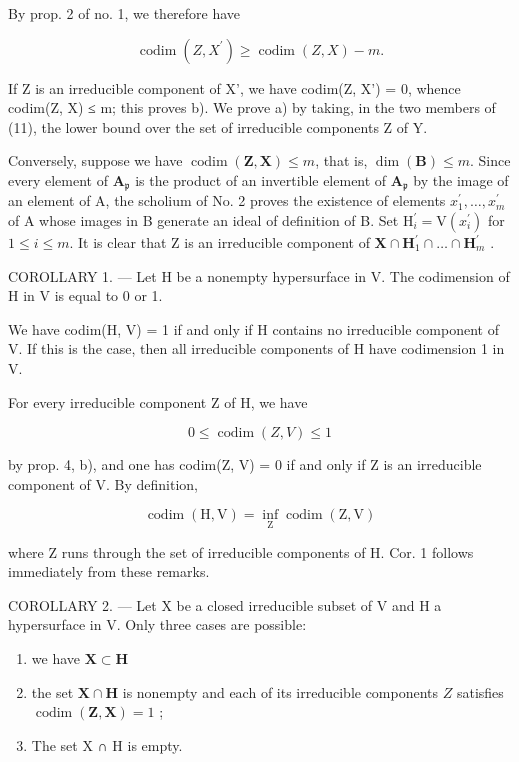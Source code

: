 By prop. 2 of no. 1, we therefore have

\[
\operatorname{codim} (Z, X ^ {\prime}) \geqslant \operatorname{codim} (Z, X) - m.\tag{11}
\]

If Z is an irreducible component of X', we have codim(Z, X') = 0, whence codim(Z, X) ≤ m; this proves b). We prove a) by taking, in the two members of (11), the lower bound over the set of irreducible components Z of Y.

Conversely, suppose we have \(\operatorname{codim}(\mathbf{Z},\mathbf{X})\leqslant m\), that is, \(\dim (\mathbf{B})\leqslant m\). Since every element of \(\mathbf{A}_{\mathfrak{p}}\) is the product of an invertible element of \(\mathbf{A}_{\mathfrak{p}}\) by the image of an element of A, the scholium of No. 2 proves the existence of elements \(x_1^{\prime},\ldots ,x_m^\prime\) of A whose images in B generate an ideal of definition of B. Set \(\mathrm{H}_i^{\prime} = \mathrm{V}(x_i^{\prime})\) for \(1\leqslant i\leqslant m\). It is clear that Z is an irreducible component of \(\mathbf{X}\cap \mathbf{H}_1^{\prime}\cap \dots \cap \mathbf{H}_m^{\prime}\) .

COROLLARY 1. --- Let H be a nonempty hypersurface in V. The codimension of H in V is equal to 0 or 1.

We have codim(H, V) = 1 if and only if H contains no irreducible component of V. If this is the case, then all irreducible components of H have codimension 1 in V.

For every irreducible component Z of H, we have

\[
0 \leqslant \operatorname{codim} (Z, V) \leqslant 1
\]

by prop. 4, b), and one has codim(Z, V) = 0 if and only if Z is an irreducible component of V. By definition,

\[
\operatorname{codim} (\mathrm{H}, \mathrm{V}) = \inf _ {\mathrm{Z}} \operatorname{codim} (\mathrm{Z}, \mathrm{V})
\]

where Z runs through the set of irreducible components of H. Cor. 1 follows immediately from these remarks.

COROLLARY 2. --- Let X be a closed irreducible subset of V and H a hypersurface in V. Only three cases are possible:

\begin{enumerate}
\def\labelenumi{\arabic{enumi})}
\item
  we have \(\mathbf{X}\subset \mathbf{H}\)
\item
  the set \(\mathbf{X} \cap \mathbf{H}\) is nonempty and each of its irreducible components \(Z\) satisfies \(\operatorname{codim}(\mathbf{Z}, \mathbf{X}) = 1\) ;
\item
  The set X ∩ H is empty.
\end{enumerate}

